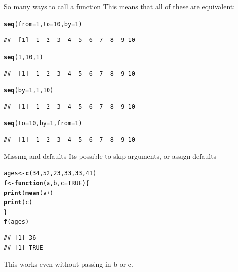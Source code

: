 \documentclass{beamer}\usepackage[]{graphicx}\usepackage[]{color}
\makeatletter
\newcommand{\hlnum}[1]{\textcolor[rgb]{0.686,0.059,0.569}{#1}}%
\newcommand{\hlstd}[1]{\textcolor[rgb]{0.345,0.345,0.345}{#1}}%
\newcommand{\hlkwa}[1]{\textcolor[rgb]{0.161,0.373,0.58}{\textbf{#1}}}%
\newcommand{\hlkwb}[1]{\textcolor[rgb]{0.69,0.353,0.396}{#1}}%
\newcommand{\hlkwc}[1]{\textcolor[rgb]{0.333,0.667,0.333}{#1}}%
\newcommand{\hlkwd}[1]{\textcolor[rgb]{0.737,0.353,0.396}{\textbf{#1}}}%
\newenvironment{kframe}{%
 \def\at@end@of@kframe{}%
 \ifinner\ifhmode%
  \def\at@end@of@kframe{\end{minipage}}%
  \begin{minipage}{\columnwidth}%
 \fi\fi%
 \def\FrameCommand##1{\hskip\@totalleftmargin \hskip-\fboxsep
 \colorbox{shadecolor}{##1}\hskip-\fboxsep
     \hskip-\linewidth \hskip-\@totalleftmargin \hskip\columnwidth}%
 \MakeFramed {\advance\hsize-\width
   \@totalleftmargin\z@ \linewidth\hsize
   \@setminipage}}%
 {\par\unskip\endMakeFramed%
 \at@end@of@kframe}
\newenvironment{knitrout}{}{} %
\makeatother
\begin{document}
\begin{frame}[fragile]{So many ways to call a function}
This means that all of these are equivalent:
\begin{knitrout}
\color{fgcolor}\begin{kframe}
\begin{alltt}
\hlkwd{seq}\hlstd{(}\hlkwc{from} \hlstd{=} \hlnum{1}\hlstd{,} \hlkwc{to} \hlstd{=} \hlnum{10}\hlstd{,} \hlkwc{by} \hlstd{=} \hlnum{1}\hlstd{)}
\end{alltt}
\begin{verbatim}
##  [1]  1  2  3  4  5  6  7  8  9 10
\end{verbatim}
\begin{alltt}
\hlkwd{seq}\hlstd{(}\hlnum{1}\hlstd{,} \hlnum{10}\hlstd{,} \hlnum{1}\hlstd{)}
\end{alltt}
\begin{verbatim}
##  [1]  1  2  3  4  5  6  7  8  9 10
\end{verbatim}
\begin{alltt}
\hlkwd{seq}\hlstd{(}\hlkwc{by} \hlstd{=} \hlnum{1}\hlstd{,} \hlnum{1}\hlstd{,} \hlnum{10}\hlstd{)}
\end{alltt}
\begin{verbatim}
##  [1]  1  2  3  4  5  6  7  8  9 10
\end{verbatim}
\begin{alltt}
\hlkwd{seq}\hlstd{(}\hlkwc{to} \hlstd{=} \hlnum{10}\hlstd{,} \hlkwc{by} \hlstd{=} \hlnum{1}\hlstd{,} \hlkwc{from} \hlstd{=} \hlnum{1}\hlstd{)}
\end{alltt}
\begin{verbatim}
##  [1]  1  2  3  4  5  6  7  8  9 10
\end{verbatim}
\end{kframe}
\end{knitrout}

\end{frame}


\begin{frame}[fragile]{Missing and defaults}
Its possible to skip arguments, or assign defaults
\begin{knitrout}
\color{fgcolor}\begin{kframe}
\begin{alltt}
\hlstd{ages} \hlkwb{<-} \hlkwd{c}\hlstd{(}\hlnum{34}\hlstd{,} \hlnum{52}\hlstd{,} \hlnum{23}\hlstd{,} \hlnum{33}\hlstd{,} \hlnum{33}\hlstd{,} \hlnum{41}\hlstd{)}
\hlstd{f} \hlkwb{<-} \hlkwa{function}\hlstd{(}\hlkwc{a}\hlstd{,} \hlkwc{b}\hlstd{,} \hlkwc{c} \hlstd{=} \hlnum{TRUE}\hlstd{) \{}
    \hlkwd{print}\hlstd{(}\hlkwd{mean}\hlstd{(a))}
    \hlkwd{print}\hlstd{(c)}
\hlstd{\}}
\hlkwd{f}\hlstd{(ages)}
\end{alltt}
\begin{verbatim}
## [1] 36
## [1] TRUE
\end{verbatim}
\end{kframe}
\end{knitrout}

This works even without passing in b or c.
\end{frame}
\end{document}
